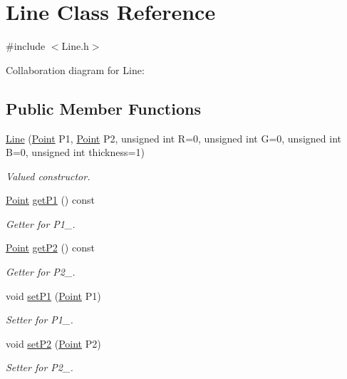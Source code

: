 \hypertarget{class_line}{}\section{Line Class Reference}
\label{class_line}


{\ttfamily \#include $<$Line.\+h$>$}



Collaboration diagram for Line\+:
\subsection*{Public Member Functions}
\begin{DoxyCompactItemize}
\item 
\mbox{\hyperlink{class_line_a2969d6c2a73284a477831915977995fd}{Line}} (\mbox{\hyperlink{class_point}{Point}} P1, \mbox{\hyperlink{class_point}{Point}} P2, unsigned int R=0, unsigned int G=0, unsigned int B=0, unsigned int thickness=1)
\begin{DoxyCompactList}\small\item\em Valued constructor. \end{DoxyCompactList}\item 
\mbox{\hyperlink{class_point}{Point}} \mbox{\hyperlink{class_line_a8f61228ee98dba6076a5c9462b8908a2}{get\+P1}} () const
\begin{DoxyCompactList}\small\item\em Getter for P1\+\_\+. \end{DoxyCompactList}\item 
\mbox{\hyperlink{class_point}{Point}} \mbox{\hyperlink{class_line_aee54ae19036b8c47282bc0c7daeffc2d}{get\+P2}} () const
\begin{DoxyCompactList}\small\item\em Getter for P2\+\_\+. \end{DoxyCompactList}\item 
void \mbox{\hyperlink{class_line_a9d58e46e5327c4215b69c47e0ebc136e}{set\+P1}} (\mbox{\hyperlink{class_point}{Point}} P1)
\begin{DoxyCompactList}\small\item\em Setter for P1\+\_\+. \end{DoxyCompactList}\item 
void \mbox{\hyperlink{class_line_a2997dd11403d3f87d812eaa5923125af}{set\+P2}} (\mbox{\hyperlink{class_point}{Point}} P2)
\begin{DoxyCompactList}\small\item\em Setter for P2\+\_\+. \end{DoxyCompactList}\item 

\end{DoxyCompactItemize}
